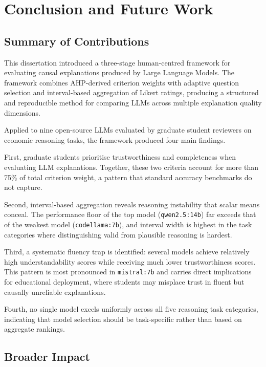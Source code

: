 \chapter{Conclusion and Future Work}
\label{ch:conclusion}

\section{Summary of Contributions}
\label{sec:conc-summary}

This dissertation introduced a three-stage human-centred framework for evaluating
causal explanations produced by Large Language Models. The framework combines
AHP-derived criterion weights with adaptive question selection and interval-based
aggregation of Likert ratings, producing a structured and reproducible method for
comparing LLMs across multiple explanation quality dimensions.

Applied to nine open-source LLMs evaluated by graduate student reviewers on economic
reasoning tasks, the framework produced four main findings.

First, graduate students prioritise trustworthiness and completeness when evaluating
LLM explanations. Together, these two criteria account for more than 75\% of total
criterion weight, a pattern that standard accuracy benchmarks do not capture.

Second, interval-based aggregation reveals reasoning instability that scalar means
conceal. The performance floor of the top model (\texttt{qwen2.5:14b}) far exceeds
that of the weakest model (\texttt{codellama:7b}), and interval width is highest in
the task categories where distinguishing valid from plausible reasoning is hardest.

Third, a systematic fluency trap is identified: several models achieve relatively
high understandability scores while receiving much lower trustworthiness scores.
This pattern is most pronounced in \texttt{mistral:7b} and carries direct
implications for educational deployment, where students may misplace trust in fluent
but causally unreliable explanations.

Fourth, no single model excels uniformly across all five reasoning task categories,
indicating that model selection should be task-specific rather than based on
aggregate rankings.

\section{Broader Impact}
\label{sec:conc-impact}

